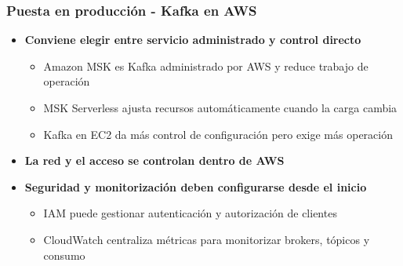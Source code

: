 \documentclass[aspectratio=169]{beamer}
\begin{document}
\begin{frame}\frametitle{Puesta en producción - Kafka en AWS}
\begin{itemize}
  \item \textbf{Conviene elegir entre servicio administrado y control directo}
  \begin{itemize}
    \item Amazon MSK es Kafka administrado por AWS y reduce trabajo de operación
    \item MSK Serverless ajusta recursos automáticamente cuando la carga cambia
    \item Kafka en EC2 da más control de configuración pero exige más operación
  \end{itemize}

  \vspace{1em}

  \item \textbf{La red y el acceso se controlan dentro de AWS}
  
  \vspace{1em}

  \item \textbf{Seguridad y monitorización deben configurarse desde el inicio}
  \begin{itemize}
    \item IAM puede gestionar autenticación y autorización de clientes
    \item CloudWatch centraliza métricas para monitorizar brokers, tópicos y consumo
  \end{itemize}
\end{itemize}
\end{frame}
\end{document}
